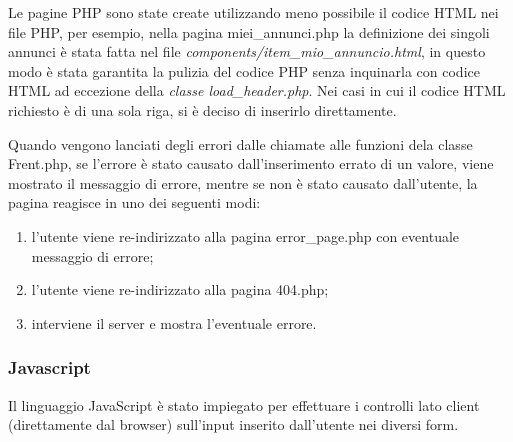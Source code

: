 \documentclass[1_relazione.tex]{subfiles}
\begin{document}
Le pagine PHP sono state create utilizzando meno possibile il codice HTML nei file PHP, per esempio, nella pagina miei_annunci.php la definizione dei singoli annunci \`{e} stata fatta nel file \textit{components/item_mio_annuncio.html}, in questo modo \`{e} stata garantita la pulizia del codice PHP senza inquinarla con codice HTML ad eccezione della \textit{classe load_header.php}. Nei casi in cui il codice HTML richiesto \`{e} di una sola riga, si \`{e} deciso di inserirlo direttamente.

Quando vengono lanciati degli errori dalle chiamate alle funzioni dela classe Frent.php, se l'errore \`{e} stato causato dall'inserimento errato di un valore, viene mostrato il messaggio di errore, mentre se non \`{e} stato causato dall'utente, la pagina reagisce in uno dei seguenti modi:
\begin{enumerate}
    \item l'utente viene re-indirizzato alla pagina error_page.php con eventuale messaggio di errore;
    \item l'utente viene re-indirizzato alla pagina 404.php;
    \item interviene il server e mostra l'eventuale errore. 
\end{enumerate}

\subsubsection{Javascript}
Il linguaggio JavaScript è stato impiegato per effettuare i controlli lato client (direttamente dal browser) sull'input inserito dall'utente nei diversi form.
\end{document}
